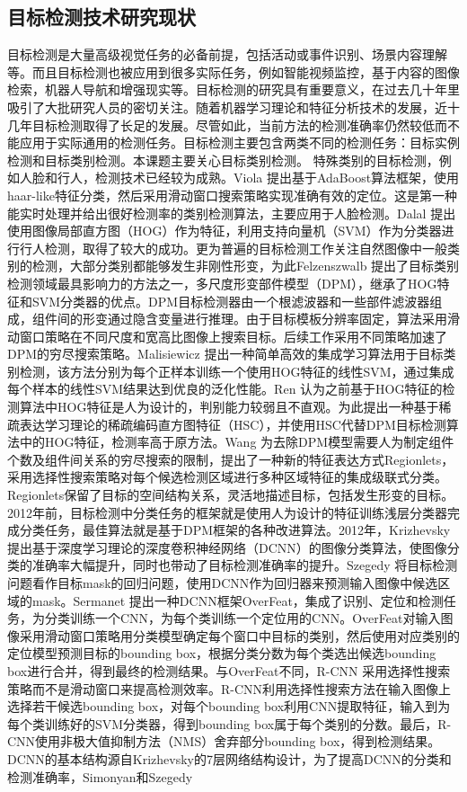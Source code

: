 \subsection{目标检测技术研究现状}
目标检测是大量高级视觉任务的必备前提，包括活动或事件识别、场景内容理解等。而且目标检测也被应用到很多实际任务，例如智能视频监控，基于内容的图像检索，机器人导航和增强现实等。目标检测的研究具有重要意义，在过去几十年里吸引了大批研究人员的密切关注。随着机器学习理论和特征分析技术的发展，近十几年目标检测取得了长足的发展。尽管如此，当前方法的检测准确率仍然较低而不能应用于实际通用的检测任务。目标检测主要包含两类不同的检测任务：目标实例检测和目标类别检测。本课题主要关心目标类别检测。
特殊类别的目标检测，例如人脸和行人，检测技术已经较为成熟。Viola \cite{via-jones-face} 提出基于AdaBoost算法框架，使用haar-like特征分类，然后采用滑动窗口搜索策略实现准确有效的定位。这是第一种能实时处理并给出很好检测率的类别检测算法，主要应用于人脸检测。Dalal \cite{hog} 提出使用图像局部直方图（HOG）作为特征，利用支持向量机（SVM）作为分类器进行行人检测，取得了较大的成功。更为普遍的目标检测工作关注自然图像中一般类别的检测，大部分类别都能够发生非刚性形变，为此Felzenszwalb\cite{dpm} 提出了目标类别检测领域最具影响力的方法之一，多尺度形变部件模型（DPM），继承了HOG特征和SVM分类器的优点。DPM目标检测器由一个根滤波器和一些部件滤波器组成，组件间的形变通过隐含变量进行推理。由于目标模板分辨率固定，算法采用滑动窗口策略在不同尺度和宽高比图像上搜索目标。后续工作采用不同策略加速了DPM的穷尽搜索策略。Malisiewicz \cite{ensemble} 提出一种简单高效的集成学习算法用于目标类别检测，该方法分别为每个正样本训练一个使用HOG特征的线性SVM，通过集成每个样本的线性SVM结果达到优良的泛化性能。Ren \cite{ren} 认为之前基于HOG特征的检测算法中HOG特征是人为设计的，判别能力较弱且不直观。为此提出一种基于稀疏表达学习理论的稀疏编码直方图特征（HSC），并使用HSC代替DPM目标检测算法中的HOG特征，检测率高于原方法。Wang \cite{wang} 为去除DPM模型需要人为制定组件个数及组件间关系的穷尽搜索的限制，提出了一种新的特征表达方式Regionlets，采用选择性搜索策略对每个候选检测区域进行多种区域特征的集成级联式分类。Regionlets保留了目标的空间结构关系，灵活地描述目标，包括发生形变的目标。2012年前，目标检测中分类任务的框架就是使用人为设计的特征训练浅层分类器完成分类任务，最佳算法就是基于DPM框架的各种改进算法。2012年，Krizhevsky \cite{alexnet} 提出基于深度学习理论的深度卷积神经网络（DCNN）的图像分类算法，使图像分类的准确率大幅提升，同时也带动了目标检测准确率的提升。Szegedy \cite{multibox} 将目标检测问题看作目标mask的回归问题，使用DCNN作为回归器来预测输入图像中候选区域的mask。Sermanet \cite{overfeat} 提出一种DCNN框架OverFeat，集成了识别、定位和检测任务，为分类训练一个CNN，为每个类训练一个定位用的CNN。OverFeat对输入图像采用滑动窗口策略用分类模型确定每个窗口中目标的类别，然后使用对应类别的定位模型预测目标的bounding box，根据分类分数为每个类选出候选bounding box进行合并，得到最终的检测结果。与OverFeat不同，R-CNN \cite{rcnn} 采用选择性搜索策略而不是滑动窗口来提高检测效率。R-CNN利用选择性搜索方法在输入图像上选择若干候选bounding box，对每个bounding box利用CNN提取特征，输入到为每个类训练好的SVM分类器，得到bounding box属于每个类别的分数。最后，R-CNN使用非极大值抑制方法（NMS）舍弃部分bounding box，得到检测结果。DCNN的基本结构源自Krizhevsky的7层网络结构设计，为了提高DCNN的分类和检测准确率，Simonyan和Szegedy \cite{vgg} 